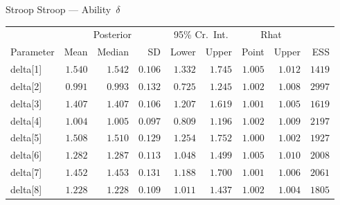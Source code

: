 \documentclass[aspectratio=169]{beamer}
\begin{document}
\begin{frame}[fragile]{Stroop Stroop --- Ability~$\delta$}
\begin{table}[h]
	\centering\scriptsize
	\label{tab:mCMCSummary}
	{
		\begin{tabular}{lrrrrrrrr}
			\toprule
			\multicolumn{1}{c}{} & \multicolumn{3}{c}{Posterior} & \multicolumn{2}{c}{95\% Cr.\ Int.} & \multicolumn{2}{c}{Rhat} & \multicolumn{1}{c}{} \\
			\cline{2-4}\cline{5-6}\cline{7-8}
			Parameter & Mean & Median & SD & Lower & Upper & Point & Upper & ESS  \\
			\cmidrule[0.4pt]{1-9}
			delta[1] & $1.540$ & $1.542$ & $0.106$ & $1.332$ & $1.745$ & $1.005$ & $1.012$ & $1419$  \\
			delta[2] & $0.991$ & $0.993$ & $0.132$ & $0.725$ & $1.245$ & $1.002$ & $1.008$ & $2997$  \\
			delta[3] & $1.407$ & $1.407$ & $0.106$ & $1.207$ & $1.619$ & $1.001$ & $1.005$ & $1619$  \\
			delta[4] & $1.004$ & $1.005$ & $0.097$ & $0.809$ & $1.196$ & $1.002$ & $1.009$ & $2197$  \\
			delta[5] & $1.508$ & $1.510$ & $0.129$ & $1.254$ & $1.752$ & $1.000$ & $1.002$ & $1927$  \\
			delta[6] & $1.282$ & $1.287$ & $0.113$ & $1.048$ & $1.499$ & $1.005$ & $1.010$ & $2008$  \\
			delta[7] & $1.452$ & $1.453$ & $0.131$ & $1.188$ & $1.700$ & $1.001$ & $1.006$ & $2061$  \\
			delta[8] & $1.228$ & $1.228$ & $0.109$ & $1.011$ & $1.437$ & $1.002$ & $1.004$ & $1805$  \\
			\bottomrule
		\end{tabular}
	}
\end{table}

\centering


\end{frame}
\end{document}

